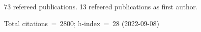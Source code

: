 73 refereed publications. 13 refeered publications as first author.

Total citations~=~2800; h-index~=~28 (2022-09-08)